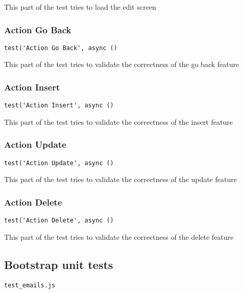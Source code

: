 \documentclass[a4paper]{article}
\begin{document}
This part of the test tries to load the edit screen

\hypertarget{toc124}{}
\subsubsection{Action Go Back}

\begin{lstlisting}
test('Action Go Back', async ()
\end{lstlisting}

This part of the test tries to validate the correctness of the go back feature

\hypertarget{toc125}{}
\subsubsection{Action Insert}

\begin{lstlisting}
test('Action Insert', async ()
\end{lstlisting}

This part of the test tries to validate the correctness of the insert feature

\hypertarget{toc126}{}
\subsubsection{Action Update}

\begin{lstlisting}
test('Action Update', async ()
\end{lstlisting}

This part of the test tries to validate the correctness of the update feature

\hypertarget{toc127}{}
\subsubsection{Action Delete}

\begin{lstlisting}
test('Action Delete', async ()
\end{lstlisting}

This part of the test tries to validate the correctness of the delete feature

\hypertarget{toc128}{}
\subsection{Bootstrap unit tests}

\begin{lstlisting}
test_emails.js
\end{lstlisting}
\end{document}
